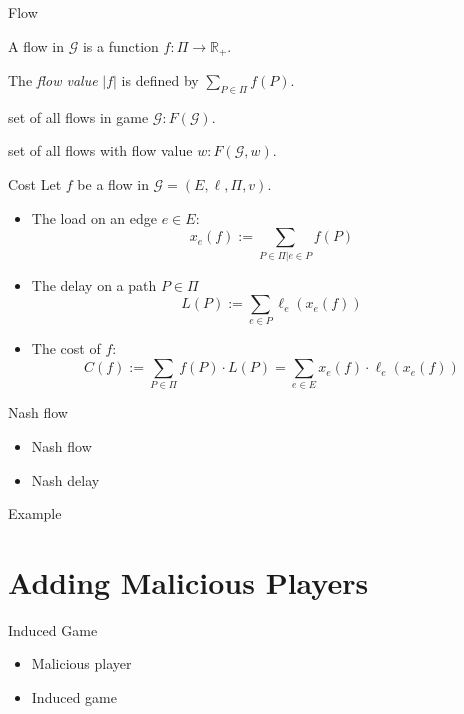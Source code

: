 \documentclass{beamer}
\begin{document}
\begin{frame}{Flow}
	\begin{definition}[Flow]
		A flow in $\mathcal G$ is a function $f: \Pi \to \mathbb{R}_+$.
	\end{definition}
	
	The \emph{flow value} $|f|$ is defined by $\sum_{P \in \Pi} f(P)$.
	
	set of all flows in game $\mathcal G: F(\mathcal G)$.
	
	set of all flows with flow value $w: F(\mathcal G, w)$.
\end{frame}

\begin{frame}{Cost}
	Let $f$ be a flow in $\mathcal G = (E, \ell, \Pi, v)$.
	\begin{itemize}
		\item The \alert{load} on an edge $e \in E$: 
			\[x_e(f) := \sum_{P \in \Pi | e \in P} f(P) \]
		\item The \alert{delay} on a path $P \in \Pi$
			\[L(P) := \sum_{e \in P} \ell_e(x_e(f)) \]
		\item The \alert{cost} of $f$:
			\[C(f) := \sum_{P \in \Pi} f(P) \cdot L(P) = \sum_{e \in E} x_e(f) \cdot \ell_e(x_e(f)) \]
	\end{itemize}
\end{frame}

\begin{frame}{Nash flow}
	\begin{itemize}
		\item Nash flow
		\item Nash delay
	\end{itemize}
\end{frame}

\begin{frame}{Example}
	
\end{frame}


\section{Adding Malicious Players}
\begin{frame}{Induced Game}
	\begin{itemize}
		\item Malicious player
		\item Induced game
	\end{itemize}
\end{frame}
\end{document}
